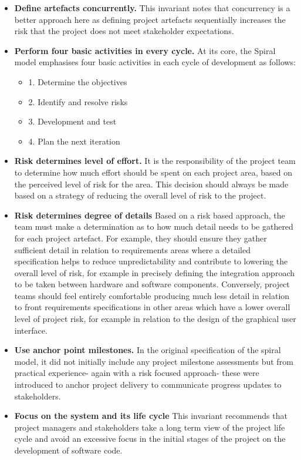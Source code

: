 \documentclass[a4paper,Times New Roman 11pt]{article}
\begin{document}
\begin{samepage}
\begin{samepage}
\begin{itemize}
\item \textbf{Define artefacts concurrently.} This invariant notes that concurrency is a better approach here as defining project artefacts sequentially increases the risk that the project does not meet stakeholder expectations.
\item \textbf{Perform four basic activities in every cycle.}
At its core, the Spiral model emphasises four basic activities in each cycle of development as follows:
\begin{itemize}
\item 1. Determine the objectives
\item 2. Identify and resolve risks 
\item 3. Development and test
\item 4. Plan the next iteration
\end{itemize}
\item \textbf {Risk determines level of effort.} It is the responsibility of the project team to determine how much effort should be spent on each project area, based on the perceived level of risk for the area. This decision should always be made based on a strategy of reducing the overall level of risk to the project.
\newpage
\item \textbf {Risk determines degree of details} Based on a risk based approach, the team must make a determination as to how much detail needs to be gathered for each project artefact. For example, they should ensure they gather sufficient detail in relation to requirements areas where a detailed specification helps to reduce unpredictability and contribute to lowering the overall level of risk, for example in precisely defining the integration approach to be taken between hardware and software components. Conversely, project teams should feel entirely comfortable producing much less detail in relation to front requirements specifications in other areas which have a lower overall level of project risk, for example in relation to the design of the graphical user interface.
\item \textbf {Use anchor point milestones.} In the original specification of the spiral model, it did not initially include any project milestone assessments but from practical experience- again with a risk focused approach- these were introduced to anchor project delivery to communicate progress updates to stakeholders.

\item \textbf {Focus on the system and its life cycle}
This invariant recommends that project managers and stakeholders take a long term view of the project life cycle and avoid an excessive focus in the initial stages of the project on the development of software code.
\end{itemize}

\end{samepage}
\end{samepage}
\end{document}
